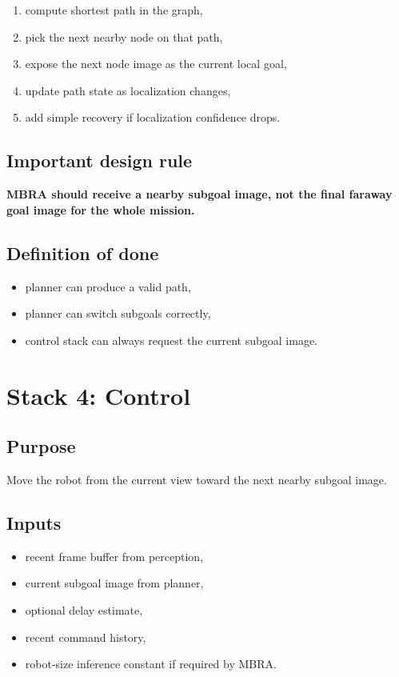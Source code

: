 \documentclass[11pt,a4paper]{article}
\begin{document}
\begin{enumerate}[nosep]
  \item compute shortest path in the graph,
  \item pick the next nearby node on that path,
  \item expose the next node image as the current local goal,
  \item update path state as localization changes,
  \item add simple recovery if localization confidence drops.
\end{enumerate}

\subsection{Important design rule}

\begin{mdframed}
\textbf{MBRA should receive a nearby subgoal image, not the final faraway goal
image for the whole mission.}
\end{mdframed}

\subsection{Definition of done}

\begin{itemize}[nosep]
  \item planner can produce a valid path,
  \item planner can switch subgoals correctly,
  \item control stack can always request the current subgoal image.
\end{itemize}


\section{Stack 4: Control}

\subsection{Purpose}

Move the robot from the current view toward the next nearby subgoal image.

\subsection{Inputs}

\begin{itemize}[nosep]
  \item recent frame buffer from perception,
  \item current subgoal image from planner,
  \item optional delay estimate,
  \item recent command history,
  \item robot-size inference constant if required by MBRA.
\end{itemize}
\end{document}
